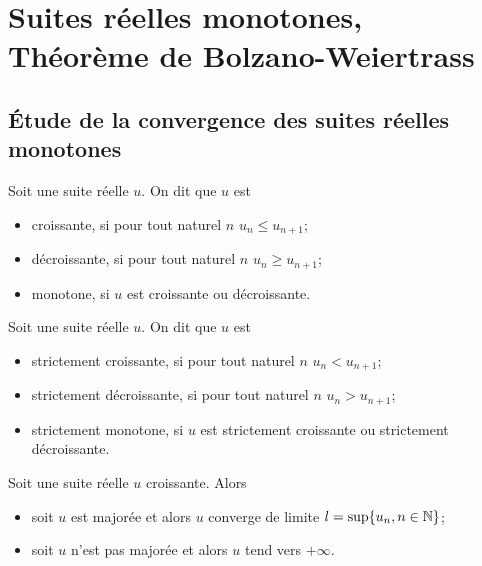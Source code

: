 \section{Suites réelles monotones, Théorème de Bolzano-Weiertrass}

\subsection{Étude de la convergence des suites réelles monotones}

\begin{defdef}
    Soit une suite réelle \(u\). On dit que \(u\) est
    \begin{itemize}
        \item croissante, si pour tout naturel \(n\) \(u_n \leqslant u_{n+1}\);
        \item décroissante, si pour tout naturel \(n\) \(u_n \geqslant u_{n+1}\);
        \item monotone, si \(u\) est croissante ou décroissante.
    \end{itemize}
\end{defdef}
\begin{defdef}
    Soit une suite réelle \(u\). On dit que \(u\) est
    \begin{itemize}
        \item strictement croissante, si pour tout naturel \(n\) \(u_n < u_{n+1}\);
        \item strictement décroissante, si pour tout naturel \(n\) \(u_n > 
            u_{n+1}\);
        \item strictement monotone, si \(u\) est strictement croissante ou 
            strictement décroissante.
    \end{itemize}
\end{defdef}
\begin{theo}
    Soit une suite réelle \(u\) croissante. Alors
    \begin{itemize}
        \item soit \(u\) est majorée et alors \(u\) converge de limite \(l = 
            \sup\{u_n, n \in \mathbb{N}\}\);
        \item soit \(u\) n'est pas majorée et alors \(u\) tend vers \(+\infty\).
    \end{itemize}
\end{theo}
